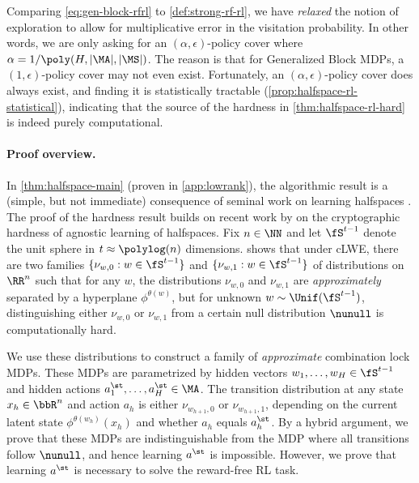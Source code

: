  





\begin{remark}
Comparing \cref{eq:gen-block-rfrl} to \cref{def:strong-rf-rl}, we have \emph{relaxed} the notion of exploration to allow for multiplicative error in the visitation probability. In other words, we are only asking for an $(\alpha,\epsilon)$-policy cover where $\alpha = 1/\poly(H,|\MA|,|\MS|)$. The reason is that for Generalized Block MDPs, a $(1,\epsilon)$-policy cover may not even exist. Fortunately, an $(\alpha,\epsilon)$-policy cover does always exist, and finding it is statistically tractable (\cref{prop:halfspace-rl-statistical}), indicating that the source of the hardness in \cref{thm:halfspace-rl-hard} is indeed purely computational.
\end{remark}

\paragraph{Proof overview.} In \cref{thm:halfspace-main} (proven in \cref{app:lowrank}), the algorithmic result is a (simple, but not immediate) consequence of seminal work on learning halfspaces \citep{blum2003noise,diakonikolas2023strongly}. The proof of the hardness result builds on recent work by \cite{tiegel2023hardness} on the cryptographic hardness of agnostic learning of halfspaces. Fix $n \in \NN$ and let $\fS^{t-1}$ denote the unit sphere in $t \approx \polylog(n)$ dimensions. \cite{tiegel2023hardness} shows that under cLWE, there are two families  $\{\nu_{w,0}: w \in \fS^{t-1}\}$ and $\{\nu_{w,1}: w \in \fS^{t-1}\}$ of distributions on $\RR^n$ such that for any $w$, the distributions $\nu_{w,0}$ and $\nu_{w,1}$ are \emph{approximately} separated by a hyperplane $\phi^{\theta(w)}$, but for unknown $w \sim \Unif(\fS^{t-1})$, distinguishing either $\nu_{w,0}$ or $\nu_{w,1}$ from a certain null distribution $\nunull$ is computationally hard.\loose

We use these distributions to construct a family of \emph{approximate} combination lock MDPs. These MDPs are parametrized by hidden vectors $w_1,\dots,w_H \in \fS^{t-1}$ and hidden actions $a^\st_1,\dots,a^\st_H \in \MA$. The transition distribution at any state $x_h\in\bbR^n$ and action $a_h$ is either $\nu_{w_{h+1},0}$ or $\nu_{w_{h+1},1}$, depending on the current latent state $\phi^{\theta(w_h)}(x_h)$ and whether $a_h$ equals $a^\st_h$. By a hybrid argument, we prove that these MDPs are indistinguishable from the MDP where all transitions follow $\nunull$, and hence learning $a^\st$ is impossible. However, we prove that learning $a^\st$ is necessary to solve the reward-free RL task.\loose

